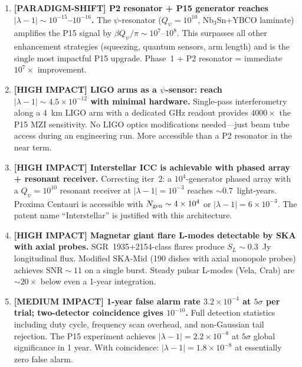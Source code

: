 \documentclass[11pt]{article}
\newcommand{\ee}[1]{\times 10^{#1}}
\newcommand{\lam}{\lambda}
\begin{document}
\begin{enumerate}

\item \textbf{[PARADIGM-SHIFT] P2 resonator + P15 generator reaches
$|\lam-1| \sim 10^{-15}$--$10^{-16}$.}
The $\psi$-resonator ($Q_\psi = 10^{10}$, Nb$_3$Sn+YBCO laminate)
amplifies the P15 signal by $\beta Q_\psi/\pi \sim 10^7$--$10^8$.
This surpasses all other enhancement strategies (squeezing,
quantum sensors, arm length) and is the single most impactful
P15 upgrade. Phase~1 + P2 resonator = immediate $10^7\times$
improvement.

\item \textbf{[HIGH IMPACT] LIGO arms as a $\psi$-sensor: reach
$|\lam-1| \sim 4.5\ee{-12}$ with minimal hardware.}
Single-pass interferometry along a 4~km LIGO arm with a dedicated
GHz readout provides $4000\times$ the P15 MZI sensitivity. No LIGO
optics modifications needed---just beam tube access during an
engineering run. More accessible than a P2 resonator in the
near term.

\item \textbf{[HIGH IMPACT] Interstellar ICC is achievable with
phased array + resonant receiver.}
Correcting iter~2: a $10^4$-generator phased array with a
$Q_\psi = 10^{10}$ resonant receiver at $|\lam-1| = 10^{-3}$
reaches $\sim 0.7$~light-years. Proxima Centauri is accessible
with $N_{\rm gen} \sim 4\ee{4}$ or $|\lam-1| = 6\ee{-3}$.
The patent name ``Interstellar'' is justified with this architecture.

\item \textbf{[HIGH IMPACT] Magnetar giant flare L-modes detectable
by SKA with axial probes.}
SGR~1935+2154-class flares produce $S_L \sim 0.3$~Jy longitudinal
flux. Modified SKA-Mid (190 dishes with axial monopole probes)
achieves $\text{SNR} \sim 11$ on a single burst. Steady pulsar
L-modes (Vela, Crab) are $\sim 20\times$ below even a 1-year
integration.

\item \textbf{[MEDIUM IMPACT] 1-year false alarm rate $3.2\ee{-4}$
at $5\sigma$ per trial; two-detector coincidence gives $10^{-10}$.}
Full detection statistics including duty cycle, frequency scan
overhead, and non-Gaussian tail rejection. The P15 experiment
achieves $|\lam-1| = 2.2\ee{-8}$ at $5\sigma$ global significance
in 1 year. With coincidence: $|\lam-1| = 1.8\ee{-8}$ at essentially
zero false alarm.

\end{enumerate}
\end{document}
